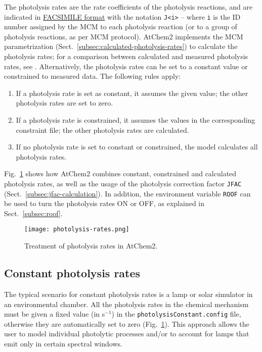 The photolysis rates are the rate coefficients of the photolysis reactions,
and are indicated in \hyperref[subsec:facsimile-format]{FACSIMILE format}
with the notation \texttt{J<i>} -- where \texttt{i} is the ID number
assigned by the MCM to each photolysis reaction (or to a group of
photolysis reactions, as per MCM protocol). AtChem2 implements the MCM
parametrization (Sect.~\ref{subsec:calculated-photolysis-rates}) to
calculate the photolysis rates; for a comparison between calculated
and measured photolysis rates, see \citet{sommariva_2020}.
Alternatively, the photolysis rates can be set to a constant value or
constrained to measured data. The following rules apply:

\begin{enumerate}
\item If a photolysis rate is set as constant, it assumes the given
  value; the other photolysis rates are set to zero.
\item If a photolysis rate is constrained, it assumes the values in
  the corresponding constraint file; the other photolysis rates are
  calculated.
\item If no photolysis rate is set to constant or constrained, the
  model calculates all photolysis rates.
\end{enumerate}

Fig.~\ref{fig:photol} shows how AtChem2 combines constant, constrained
and calculated photolysis rates, as well as the usage of the photolysis
correction factor \texttt{JFAC} (Sect.~\ref{subsec:jfac-calculation}).
In addition, the environment variable \texttt{ROOF} can be used to
turn the photolysis rates ON or OFF, as explained in
Sect.~\ref{subsec:roof}.

\begin{figure}[htb]
  \centering
  \texttt{[image: photolysis-rates.png]}
  \caption{Treatment of photolysis rates in AtChem2.}
  \label{fig:photol}
\end{figure}

\subsection{Constant photolysis rates} \label{subsec:constant-photolysis-rates}

The typical scenario for constant photolysis rates is a lamp or solar
simulator in an environmental chamber. All the photolysis rates in the
chemical mechanism must be given a fixed value (in s$^{-1}$) in the
\texttt{photolysisConstant.config} file, otherwise they are
automatically set to zero (Fig.~\ref{fig:photol}). This approach
allows the user to model individual photolytic processes and/or to
account for lamps that emit only in certain spectral windows.

